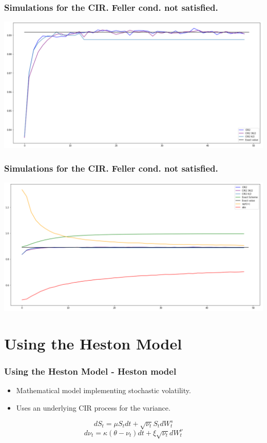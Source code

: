 \documentclass[12pt]{beamer}
\begin{document}
\begin{frame}
	\frametitle{Simulations for the CIR. Feller cond. not satisfied.}
	\centering
	\includegraphics[width=\textwidth]{good_schemes_not_feller.png}
\end{frame}

\begin{frame}
	\frametitle{Simulations for the CIR. Feller cond. not satisfied.}
	\centering
	\includegraphics[width=\textwidth]{schemes_not_feller.png}
\end{frame}


\section{Using the Heston Model}
\frame{\tableofcontents[currentsection]}


\begin{frame}
\frametitle{Using the Heston Model - Heston model}
\begin{itemize}
  \item Mathematical model implementing stochastic volatility.
  \item Uses an underlying CIR process for the variance.
\end{itemize}

$$dS_t=\mu S_tdt+\sqrt{\nu_t}S_tdW_t^s$$
$$d\nu_t = \kappa(\theta-\nu_t)dt+\xi\sqrt{\nu_t}dW_t^\nu$$

\end{frame}
\end{document}

